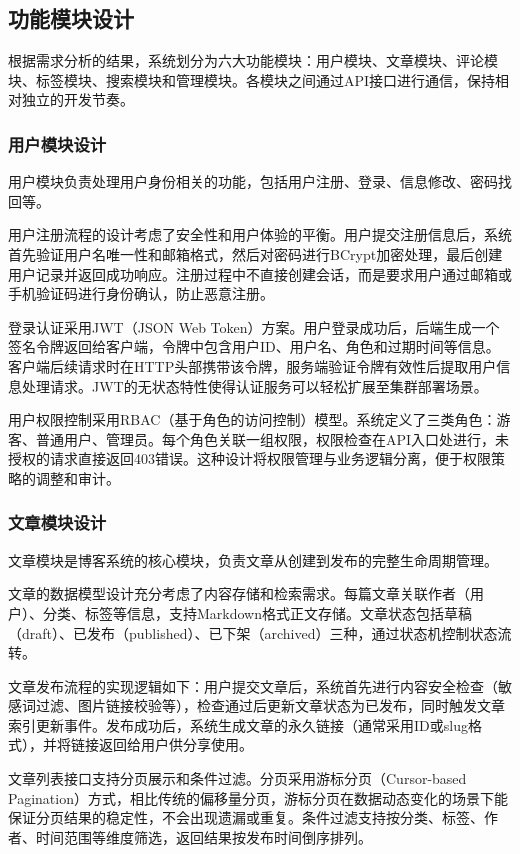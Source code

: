 \documentclass[UTF8,AutoFakeBold=1,AutoFakeSlant,zihao=-4]{SCAU}
\begin{document}
 \subsection{功能模块设计}

 根据需求分析的结果，系统划分为六大功能模块：用户模块、文章模块、评论模块、标签模块、搜索模块和管理模块。各模块之间通过API接口进行通信，保持相对独立的开发节奏。

 \subsubsection{用户模块设计}

 用户模块负责处理用户身份相关的功能，包括用户注册、登录、信息修改、密码找回等。

 用户注册流程的设计考虑了安全性和用户体验的平衡。用户提交注册信息后，系统首先验证用户名唯一性和邮箱格式，然后对密码进行BCrypt加密处理，最后创建用户记录并返回成功响应。注册过程中不直接创建会话，而是要求用户通过邮箱或手机验证码进行身份确认，防止恶意注册。

 登录认证采用JWT（JSON Web Token）方案。用户登录成功后，后端生成一个签名令牌返回给客户端，令牌中包含用户ID、用户名、角色和过期时间等信息。客户端后续请求时在HTTP头部携带该令牌，服务端验证令牌有效性后提取用户信息处理请求。JWT的无状态特性使得认证服务可以轻松扩展至集群部署场景。

 用户权限控制采用RBAC（基于角色的访问控制）模型。系统定义了三类角色：游客、普通用户、管理员。每个角色关联一组权限，权限检查在API入口处进行，未授权的请求直接返回403错误。这种设计将权限管理与业务逻辑分离，便于权限策略的调整和审计。

 \subsubsection{文章模块设计}

 文章模块是博客系统的核心模块，负责文章从创建到发布的完整生命周期管理。

 文章的数据模型设计充分考虑了内容存储和检索需求。每篇文章关联作者（用户）、分类、标签等信息，支持Markdown格式正文存储。文章状态包括草稿（draft）、已发布（published）、已下架（archived）三种，通过状态机控制状态流转。

 文章发布流程的实现逻辑如下：用户提交文章后，系统首先进行内容安全检查（敏感词过滤、图片链接校验等），检查通过后更新文章状态为已发布，同时触发文章索引更新事件。发布成功后，系统生成文章的永久链接（通常采用ID或slug格式），并将链接返回给用户供分享使用。

 文章列表接口支持分页展示和条件过滤。分页采用游标分页（Cursor-based Pagination）方式，相比传统的偏移量分页，游标分页在数据动态变化的场景下能保证分页结果的稳定性，不会出现遗漏或重复。条件过滤支持按分类、标签、作者、时间范围等维度筛选，返回结果按发布时间倒序排列。
\end{document}
